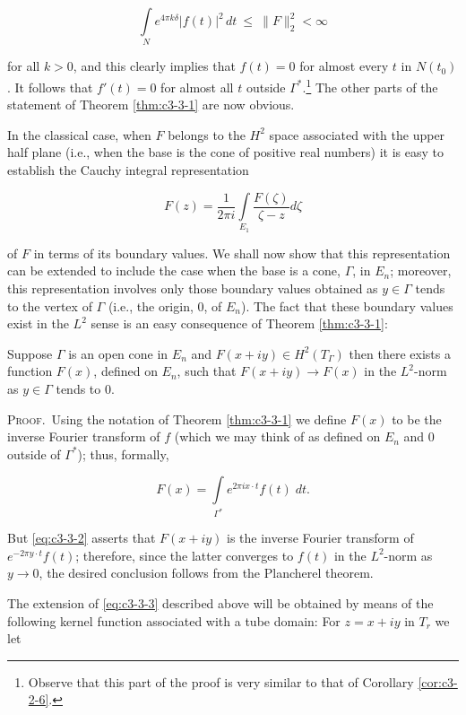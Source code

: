 \[
\int\limits_{N} e^{4\pi k\delta}|f(t)|^{2}\,dt\ \leq\ \|F\|_{2}^{2}<\infty
\]

for all $k > 0$, and this clearly implies that $f(t) = 0$ for almost every $t$ in $N(t_0)$. It follows that $f'(t) = 0$ for almost all $t$ outside $\Gamma^*$.\footnote{Observe that this part of the proof is very similar to that of Corollary \ref{cor:c3-2-6}.} The other parts of the statement of Theorem \ref{thm:c3-3-1} are now obvious.

In the classical case, when $F$ belongs to the $H^{2}$ space associated with the upper half plane (i.e., when the base is the cone of positive real numbers) it is easy to establish the Cauchy integral representation

\begin{equation}\label{eq:c3-3-3}
F(z)=\frac{1}{2\pi i}\int\limits_{E_{1}}\frac{F(\zeta)}{\zeta-z}d\zeta
\end{equation}

of $F$ in terms of its boundary values. We shall now show that this representation can be extended to include the case when the base is a cone, $\Gamma$, in $E_n$; moreover, this representation involves only those boundary values obtained as $y \in \Gamma$ tends to the vertex of $\Gamma$ (i.e., the origin, $0$, of $E_n$). The fact that these boundary values exist in the $L^2$ sense is an easy consequence of Theorem \ref{thm:c3-3-1}:

\begin{corollary}
\label{cor:c3-3-4}
Suppose $\Gamma$ is an open cone in $E_n$ and $F(x + iy) \in H^2(T_\Gamma)$ then there exists a function $F(x)$, defined on $E_n$, such that $F(x + iy) \to F(x)$ in the $L^2$-norm as $y \in \Gamma$ tends to 0.
\end{corollary}

\textsc{Proof.}\ Using the notation of Theorem \ref{thm:c3-3-1} we define $F(x)$ to be the inverse Fourier transform of $f$ (which we may think of as defined on $E_n$ and 0 outside of $\Gamma^*$); thus, formally,

\[
F(x)=\int\limits_{\Gamma^{*}}e^{2\pi i x\cdot t}f(t)\;d t.
\]

But \eqref{eq:c3-3-2} asserts that $F(x + iy)$ is the inverse Fourier transform of $e^{-2\pi y\cdot t}f(t)$; therefore, since the latter converges to $f(t)$ in the $L^2$-norm as $y \to 0$, the desired conclusion follows from the Plancherel theorem.

The extension of \eqref{eq:c3-3-3} described above will be obtained by means of the following kernel function associated with a tube domain: For $z = x + iy$ in $T_{r}$ we let

